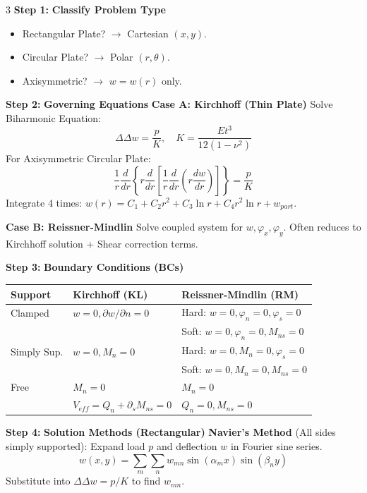 \documentclass[8pt]{extarticle}
\newcommand{\step}[1]{\textbf{\scriptsize Step #1:}}
\begin{document}
\begin{multicols*}{3}
\step{1} \textbf{Classify Problem Type}
\begin{itemize}
    \item Rectangular Plate? $\rightarrow$ Cartesian $(x,y)$.
    \item Circular Plate? $\rightarrow$ Polar $(r, \theta)$.
    \item Axisymmetric? $\rightarrow$ $w=w(r)$ only.
\end{itemize}

\step{2} \textbf{Governing Equations}
\textbf{Case A: Kirchhoff (Thin Plate)}
Solve Biharmonic Equation:
\[ \Delta\Delta w = \frac{p}{K}, \quad K = \frac{Et^3}{12(1-\nu^2)} \]
For Axisymmetric Circular Plate:
\[ \frac{1}{r} \frac{d}{dr} \left\{ r \frac{d}{dr} \left[ \frac{1}{r} \frac{d}{dr} \left( r \frac{dw}{dr} \right) \right] \right\} = \frac{p}{K} \]
Integrate 4 times: $w(r) = C_1 + C_2 r^2 + C_3 \ln r + C_4 r^2 \ln r + w_{part}$.

\textbf{Case B: Reissner-Mindlin}
Solve coupled system for $w, \varphi_x, \varphi_y$.
Often reduces to Kirchhoff solution + Shear correction terms.

\step{3} \textbf{Boundary Conditions (BCs)}
\begin{center}
\scriptsize
\renewcommand{\arraystretch}{1.2}
\begin{tabular}{@{}l p{3.5cm} p{4cm}@{}}
\toprule
\textbf{Support} & \textbf{Kirchhoff (KL)} & \textbf{Reissner-Mindlin (RM)} \\
\midrule
Clamped & $w=0, \partial w/\partial n = 0$ & Hard: $w=0, \varphi_n=0, \varphi_s=0$ \\
& & Soft: $w=0, \varphi_n=0, M_{ns}=0$ \\
\addlinespace
Simply Sup. & $w=0, M_n=0$ & Hard: $w=0, M_n=0, \varphi_s=0$ \\
& & Soft: $w=0, M_n=0, M_{ns}=0$ \\
\addlinespace
Free & $M_n=0$ & $M_n=0$ \\
& $V_{eff} = Q_n + \partial_s M_{ns} = 0$ & $Q_n=0, M_{ns}=0$ \\
\bottomrule
\end{tabular}
\end{center}

\step{4} \textbf{Solution Methods (Rectangular)}
\textbf{Navier's Method} (All sides simply supported):
Expand load $p$ and deflection $w$ in Fourier sine series.
\[ w(x,y) = \sum_{m} \sum_{n} w_{mn} \sin(\alpha_m x) \sin(\beta_n y) \]
Substitute into $\Delta\Delta w = p/K$ to find $w_{mn}$.


\end{multicols*}
\end{document}
